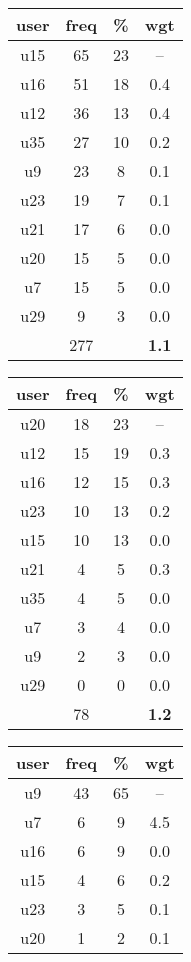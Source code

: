 \begin{appendices}
\begin{table}
\centering
\begin{tabular}{ |c|c|c|c| }
	\hline
	\textbf{user} & \textbf{freq} & \textbf{\%} & \textbf{wgt} \\
	\hline
	u15 & 65 & 23 & -- \\
	u16 & 51 & 18 & 0.4 \\
	u12 & 36 & 13 & 0.4 \\
	u35 & 27 & 10 & 0.2 \\
	u9 & 23 & 8 & 0.1 \\
	u23 & 19 & 7 & 0.1 \\
	u21 & 17 & 6 & 0.0 \\
	u20 & 15 & 5 & 0.0 \\
	u7 & 15 & 5 & 0.0 \\
	u29 & 9 & 3 & 0.0 \\
	 & 277 & & \textbf{1.1} \\
	\hline
\end{tabular}
\begin{tabular}{ |c|c|c|c| }
	\hline
	\textbf{user} & \textbf{freq} & \textbf{\%} & \textbf{wgt} \\
	\hline
	u20 & 18 & 23 & -- \\
	u12 & 15 & 19 & 0.3 \\
	u16 & 12 & 15 & 0.3 \\
	u23 & 10 & 13 & 0.2 \\
	u15 & 10 & 13 & 0.0 \\
	u21 & 4 & 5 & 0.3 \\
	u35 & 4 & 5 & 0.0 \\
	u7 & 3 & 4 & 0.0 \\
	u9 & 2 & 3 & 0.0 \\
	u29 & 0 & 0 & 0.0 \\
	 & 78 & & \textbf{1.2} \\
	\hline
\end{tabular}
\begin{tabular}{ |c|c|c|c| }
	\hline
	\textbf{user} & \textbf{freq} & \textbf{\%} & \textbf{wgt} \\
	\hline
	u9 & 43 & 65 & -- \\
	u7 & 6 & 9 & 4.5 \\
	u16 & 6 & 9 & 0.0 \\
	u15 & 4 & 6 & 0.2 \\
	u23 & 3 & 5 & 0.1 \\
	u20 & 1 & 2 & 0.1 \\

\end{tabular}
\end{table}
\end{appendices}
